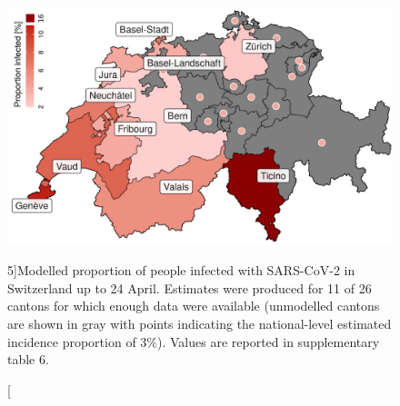 \begin{figure}\centering
  \includegraphics[width=\textwidth]{fig_covid-switzerland-npi/FIGURE_5_mod.png}
  \caption[Modelled proportion of people infected with SARS-CoV-2 in Switzerland.][5\baselineskip]{Modelled proportion of people infected with SARS-CoV-2 in Switzerland up to 24 April. Estimates were produced for 11 of 26 cantons for which enough data were available (unmodelled cantons are shown in gray with points indicating the national-level estimated incidence proportion of 3\%). Values are reported in supplementary table 6.}
  \label{fig:covid-ch-map}
\end{figure}

